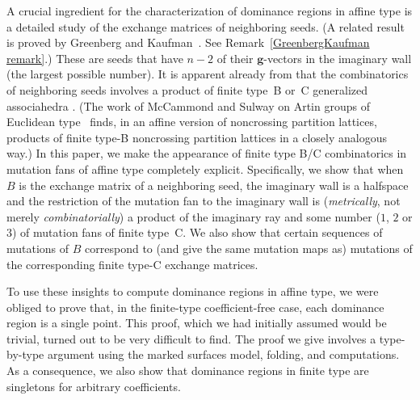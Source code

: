 \documentclass{amsart}
\theoremstyle{definition}
\theoremstyle{remark}
\numberwithin{equation}{section}
\newcommand{\0}{{\mathbf{0}}}
\newcommand{\g}{\mathbf{g}}
\newcommand{\tB}{{\widetilde{B}}}
\begin{document}

A crucial ingredient for the characterization of dominance regions in affine type is a detailed study of the exchange matrices of neighboring seeds.  
(A related result is proved by Greenberg and Kaufman~\cite{GreenbergKaufman}.
See Remark~\ref{GreenbergKaufman remark}.)
These are seeds that have $n-2$ of their $\g$-vectors in the imaginary wall (the largest possible number).
It is apparent already from \cite{affdenom} that the combinatorics of neighboring seeds involves a product of finite type~B or~C generalized associahedra \cite[Propositions~5.13, 6,13]{affdenom}.  
(The work of McCammond and Sulway on Artin groups of Euclidean type~\cite{McSul} finds, in an affine version of noncrossing partition lattices, products of finite type-B noncrossing partition lattices in a closely analogous way.)
In this paper, we make the appearance of finite type B/C combinatorics in mutation fans of affine type completely explicit.
Specifically, we show that when $B$ is the exchange matrix of a neighboring seed, the imaginary wall is a halfspace and the restriction of the mutation fan to the imaginary wall is (\emph{metrically}, not merely \emph{combinatorially}) a product of the imaginary ray and some number ($1$, $2$ or $3$) of mutation fans of finite type~C.
We also show that certain sequences of mutations of $B$ correspond to (and give the same mutation maps as) mutations of the corresponding finite type-C exchange matrices.

To use these insights to compute dominance regions in affine type, we were obliged to prove that, in the finite-type coefficient-free case, each dominance region is a single point.
This proof, which we had initially assumed would be trivial, turned out to be very difficult to find.
The proof we give involves a type-by-type argument using the marked surfaces model, folding, and computations.
As a consequence, we also show that dominance regions in finite type are singletons for arbitrary coefficients.
\end{document}

